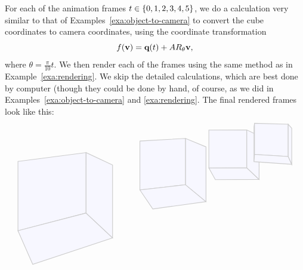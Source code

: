 \begin{solution}
  For each of the animation frames $t\in\left\{0,1,2,3,4,5\right\}$, we do a
  calculation very similar to that of
  Examples~\ref{exa:object-to-camera} to convert the cube coordinates
  to camera coordinates, using the coordinate transformation
  \begin{equation*}
    f(\vect{v}) = \vect{q}(t) + AR_{\theta}\vect{v},
  \end{equation*}
  where $\theta=\frac{\pi}{10}t$. We then render each of the frames
  using the same method as in Example~\ref{exa:rendering}. We skip the
  detailed calculations, which are best done by computer (though they
  could be done by hand, of course, as we did in
  Examples~\ref{exa:object-to-camera} and {\ref{exa:rendering}}. The
  final rendered frames look like this:
  \begin{equation*}
    \begin{tikzpicture}[scale=12, thick]
      \draw[black!20,fill=blue!3] (-0.2979,-0.2128) -- (-0.5366,-0.2439) -- (-0.5366,-0.4878) -- (-0.2979,-0.4255) -- cycle;
      \draw[black!20,fill=blue!3] (-0.2051,-0.5128) -- (-0.2979,-0.4255) -- (-0.5366,-0.4878) -- (-0.4848,-0.6061) -- cycle;
      \draw[black!20,fill=blue!3] (-0.2051,-0.2564) -- (-0.2979,-0.2128) -- (-0.2979,-0.4255) -- (-0.2051,-0.5128) -- cycle;

      \draw[black!20,fill=blue!3] (0.0508,-0.1630) -- (-0.1092,-0.1721) -- (-0.1092,-0.3442) -- (0.0508,-0.3260) -- cycle;
      \draw[black!20,fill=blue!3] (0.1224,-0.3855) -- (0.0508,-0.3260) -- (-0.1092,-0.3442) -- (-0.0640,-0.4111) -- cycle;
      \draw[black!20,fill=blue!3] (0.1224,-0.1927) -- (0.0508,-0.1630) -- (0.0508,-0.3260) -- (0.1224,-0.3855) -- cycle;

      \draw[black!20,fill=blue!3] (0.2654,-0.1332) -- (0.1325,-0.1335) -- (0.1325,-0.2669) -- (0.2654,-0.2664) -- cycle;
      \draw[black!20,fill=blue!3] (0.3085,-0.3073) -- (0.2654,-0.2664) -- (0.1325,-0.2669) -- (0.1552,-0.3080) -- cycle;
      \draw[black!20,fill=blue!3] (0.3085,-0.1537) -- (0.2654,-0.1332) -- (0.2654,-0.2664) -- (0.3085,-0.3073) -- cycle;

      \draw[black!20,fill=blue!3] (0.2907,-0.1224) -- (0.2907,-0.2448) -- (0.2925,-0.2192) -- (0.2925,-0.1096) -- cycle;
      \draw[black!20,fill=blue!3] (0.4105,-0.1132) -- (0.2925,-0.1096) -- (0.2925,-0.2192) -- (0.4105,-0.2265) -- cycle;
      \draw[black!20,fill=blue!3] (0.4229,-0.2540) -- (0.4105,-0.2265) -- (0.2925,-0.2192) -- (0.2907,-0.2448) -- cycle;
      \draw[black!20,fill=blue!3] (0.4229,-0.1270) -- (0.4105,-0.1132) -- (0.4105,-0.2265) -- (0.4229,-0.2540) -- cycle;


\end{tikzpicture}
\end{equation*}
\end{solution}
